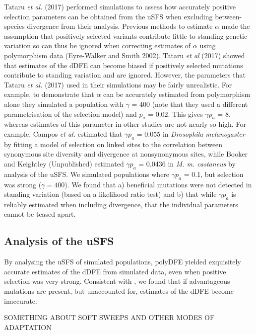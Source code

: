 \documentclass[11pt]{article}
\begin{document}
Tataru \textit{et al.} (2017) performed simulations to assess how accurately positive selection parameters can be obtained from the uSFS when excluding between-species divergence from their analysis. Previous methods to estimate $\alpha$ made the assumption that positively selected variants contribute little  to standing genetic variation so can thus be ignored when correcting estimates of $\alpha$ using polymorphism data (Eyre-Walker and Smith 2002). Tataru \textit{et al} (2017) showed  that estimates of the dDFE can become biased if positively selected mutations contribute to standing variation and are ignored. However, the parameters that Tataru \textit{et al.} (2017) used in their simulations may be fairly unrealistic. For example, to demonstrate that $\alpha$ can be accurately estimated from polymorphism alone they simulated a population with $\gamma$ = 400 (note that they used a different parametrisation of the selection model) and $p_a$ = 0.02. This gives $\gamma p_a$ = 8, whereas estimates of this parameter in other studies are not nearly so high. For example, Campos \textit{et al.} estimated that $\gamma p_a$ = 0.055 in \textit{Drosophila melanogaster} by fitting a model of selection on linked sites to the correlation between synonymous site diversity and divergence at nonsynonymous sites, while Booker and Keightley (Unpublished) estimated $\gamma p_a$ = 0.0436 in \textit{M. m. castaneus} by analysis of the uSFS. We simulated populations where $\gamma p_a$ = 0.1, but selection was strong ($\gamma = 400$). We found that a) beneficial mutations were not detected in standing variation (based on a likelihood ratio test) and b) that while $\gamma p_a$ is reliably estimated when including divergence, that the individual parameters cannot be teased apart. 

\subsection{Analysis of the uSFS}

By analysing the uSFS of simulated populations, polyDFE yielded exquisitely accurate estimates of the dDFE from simulated data, even when positive selection was very strong. Consistent with \cite{RN354}, we found that if advantageous mutations are present, but unaccounted for, estimates of the dDFE become inaccurate. 


SOMETHING ABOUT SOFT SWEEPS AND OTHER MODES OF ADAPTATION
\end{document}

